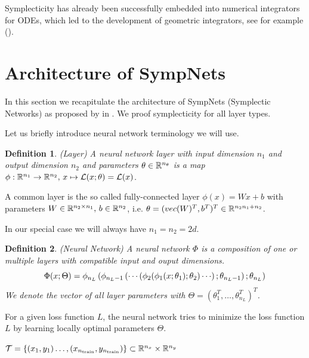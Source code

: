 \documentclass[twoside,a4paper]{article}
\newtheorem{definition}{Definition}
\begin{document}
Symplecticity has already been successfully embedded into numerical integrators for ODEs, which
led to the development of geometric integrators, see for example \citeauthor{hairer2006}
(\cite{hairer2006}).

\section{Architecture of SympNets}

In this section we recapitulate the architecture of SympNets (Symplectic Networks) as
proposed by \citeauthor{Jin2020} in \cite{Jin2020}. We proof
symplecticity for all layer types.

Let us briefly introduce neural network terminology we will use.


\begin{definition}
	(Layer)
	A neural network layer with input dimension $n_1$ and output dimension $n_2$
	and parameters $\theta \in \mathbb{R}^{n_\theta}$ is a map 
	$\phi : \mathbb{R}^{n_1} \to \mathbb{R}^{n_2},\, x \mapsto \mathcal{L}(x;\theta) = \mathcal{L}(x)$.
\end{definition}

A common layer is the so called fully-connected layer
$\phi(x) = Wx +b$ with parameters $W \in \mathbb{R}^{n_2 \times n_1},\, b \in \mathbb{R}^{n_2}$,
i.e. $\theta = (vec(W)^T, b^T)^T \in \mathbb{R}^{n_2 n_1 + n_2}$.

In our special case we will always have $n_1 = n_2 = 2d$.

\begin{definition}
	(Neural Network)
	A neural network $\Phi$ is a composition of one or multiple layers with
	compatible input and ouput dimensions. 
	\begin{equation*}
		\Phi(x;\Theta) = \phi_{n_L} \lb \phi_{n_L-1} \lb \cdots
		\lb \phi_2(
		\phi_1(x;\theta_1); \theta_2 ) \cdots \rb ; \theta_{n_L-1} \rb ; \theta_{n_L} \rb
	\end{equation*}
	We denote the vector of all
	layer parameters with $\Theta = (\theta_1^T, \dots, \theta_{n_L}^T)^T$.
\end{definition}

For a given loss function $L$, the neural network tries to minimize the loss 
function $L$ by learning locally optimal parameters $\Theta$.

$\mathcal{T} = \{(x_1, y_1) \dots, (x_{n_{\text{train}}},y_{n_{\text{train}}}) \}
\subset \mathbb{R}^{n_x} \times \mathbb{R}^{n_y}$
\end{document}
